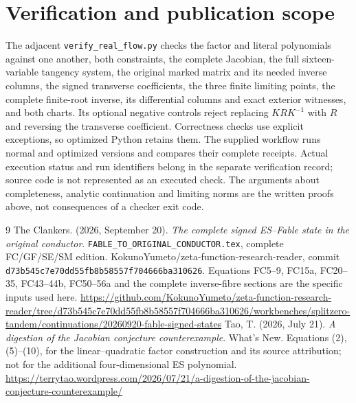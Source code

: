 \documentclass[11pt]{article}
\begin{document}
\section{Verification and publication scope}
The adjacent \texttt{verify\_real\_flow.py} checks the factor and literal
polynomials against one another, both constraints, the complete Jacobian,
the full sixteen-variable tangency system, the original marked matrix
and its needed inverse columns, the signed transverse coefficients,
the three finite limiting points, the complete finite-root inverse,
its differential columns and exact exterior witnesses, and both charts.
Its optional negative controls reject replacing $KRK^{-1}$ with $R$
and reversing the transverse coefficient. Correctness checks use explicit
exceptions, so optimized Python retains them. The supplied workflow runs
normal and optimized versions and compares their complete receipts.
Actual execution status and run identifiers belong in the separate
verification record; source code is not represented as an executed check.
The arguments about completeness, analytic continuation and limiting
norms are the written proofs above, not consequences of a checker exit code.

\begin{thebibliography}{9}
The Clankers. (2026, September 20).
\emph{The complete signed ES--Fable state in the original conductor}.
\texttt{FABLE\_TO\_ORIGINAL\_CONDUCTOR.tex}, complete FC/GF/SE/SM edition.
KokunoYumeto/zeta-function-research-reader, commit
\texttt{d73b545c7e70dd55fb8b58557f704666ba310626}.
Equations FC5--9, FC15a, FC20--35, FC43--44b, FC50--56a and the
complete inverse-fibre sections are the specific inputs used here.
\url{https://github.com/KokunoYumeto/zeta-function-research-reader/tree/d73b545c7e70dd55fb8b58557f704666ba310626/workbenches/splitzero-tandem/continuations/20260920-fable-signed-states}
Tao, T. (2026, July 21).
\emph{A digestion of the Jacobian conjecture counterexample}.
What's New. Equations (2), (5)--(10), for the linear--quadratic factor
construction and its source attribution; not for the additional
four-dimensional ES polynomial.
\url{https://terrytao.wordpress.com/2026/07/21/a-digestion-of-the-jacobian-conjecture-counterexample/}
\end{thebibliography}
\end{document}
